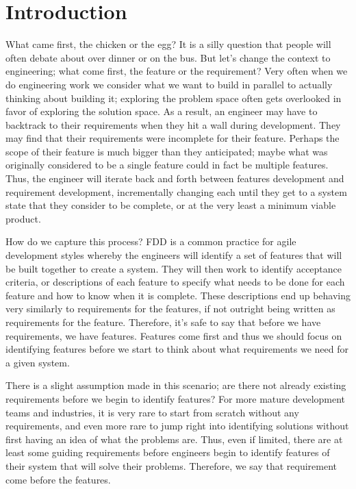 \chapter{Introduction}

What came first, the chicken or the egg? It is a silly question that people will often debate about over dinner or on the bus. But let's change the context to engineering; what come first, the feature or the requirement? Very often when we do engineering work we consider what we want to build in parallel to actually thinking about building it; exploring the problem space often gets overlooked in favor of exploring the solution space. As a result, an engineer may have to backtrack to their requirements when they hit a wall during development. They may find that their requirements were incomplete for their feature. Perhaps the scope of their feature is much bigger than they anticipated; maybe what was originally considered to be a single feature could in fact be multiple features. Thus, the engineer will iterate back and forth between features development and requirement development, incrementally changing each until they get to a system state that they consider to be complete, or at the very least a minimum viable product. 

How do we capture this process? \ac{FDD} is a common practice for agile development styles whereby the engineers will identify a set of features that will be built together to create a system. They will then work to identify acceptance criteria, or descriptions of each feature to specify what needs to be done for each feature and how to know when it is complete. These descriptions end up behaving very similarly to requirements for the features, if not outright being written as requirements for the feature. Therefore, it's safe to say that before we have requirements, we have features. Features come first and thus we should focus on identifying features before we start to think about what requirements we need for a given system.

There is a slight assumption made in this scenario; are there not already existing requirements before we begin to identify features? For more mature development teams and industries, it is very rare to start from scratch without any requirements, and even more rare to jump right into identifying solutions without first having an idea of what the problems are. Thus, even if limited, there are at least some guiding requirements before engineers begin to identify features of their system that will solve their problems. Therefore, we say that requirement come before the features. 

